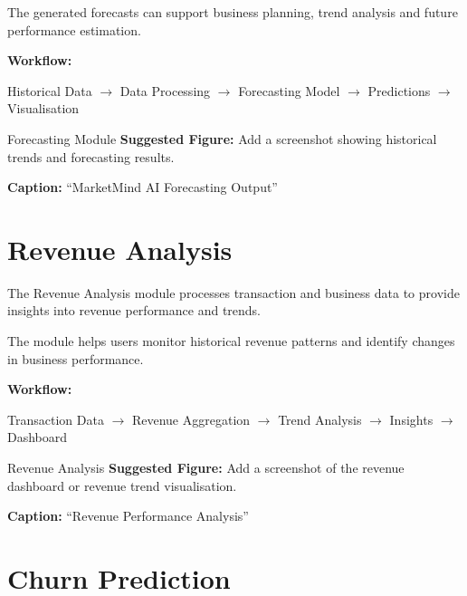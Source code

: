 \documentclass[12pt,a4paper]{report}
\begin{document}
The generated forecasts can support business planning, trend analysis
and future performance estimation.

\textbf{Workflow:}

\begin{center}
Historical Data
$\rightarrow$
Data Processing
$\rightarrow$
Forecasting Model
$\rightarrow$
Predictions
$\rightarrow$
Visualisation
\end{center}

\begin{screenshotplaceholder}{Forecasting Module}
\textbf{Suggested Figure:} Add a screenshot showing historical trends
and forecasting results.

\textbf{Caption:} ``MarketMind AI Forecasting Output''
\end{screenshotplaceholder}



\section{Revenue Analysis}

The Revenue Analysis module processes transaction and business data to
provide insights into revenue performance and trends.

The module helps users monitor historical revenue patterns and identify
changes in business performance.

\textbf{Workflow:}

\begin{center}
Transaction Data
$\rightarrow$
Revenue Aggregation
$\rightarrow$
Trend Analysis
$\rightarrow$
Insights
$\rightarrow$
Dashboard
\end{center}

\begin{screenshotplaceholder}{Revenue Analysis}
\textbf{Suggested Figure:} Add a screenshot of the revenue dashboard
or revenue trend visualisation.

\textbf{Caption:} ``Revenue Performance Analysis''
\end{screenshotplaceholder}



\section{Churn Prediction}
\end{document}
